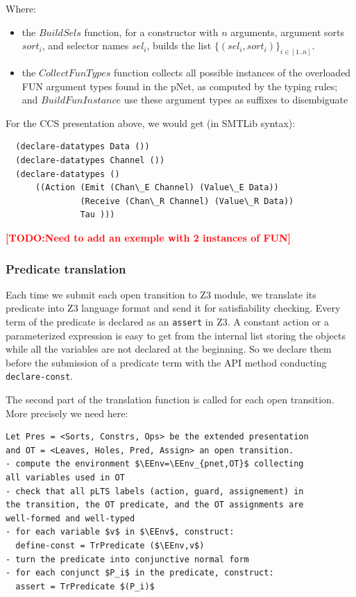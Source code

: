 \documentclass{lncs/llncs}
\newcommand{\TODO}[1]{\textcolor{red}{\textbf{[TODO:#1]}}}
\newcommand{\QIN}[1]{\textcolor{airforceblue}{#1}}
\begin{document}
\smallskip
Where:
\begin{itemize}
  \item the $BuildSels$ function, for a constructor with $n$ arguments,
argument sorts $sort_i$, and selector names $sel_i$, builds the list
$\{(sel_i, sort_i)\}_{i\in[1..n]}$.
\item the $CollectFunTypes$ function collects all possible instances
  of the overloaded FUN argument types found in the pNet, as computed by the typing
  rules; and $BuildFunInstance$ use these argument types as suffixes
  to disembiguate 
\end{itemize}


\begin{example}
  For the CCS presentation above, we would get (in SMTLib syntax):
\begin{lstlisting}
  (declare-datatypes Data ())
  (declare-datatypes Channel ())
  (declare-datatypes ()
      ((Action (Emit (Chan\_E Channel) (Value\_E Data))
               (Receive (Chan\_R Channel) (Value\_R Data))
               Tau )))
  \end{lstlisting}
\end{example}

\TODO{Need to add an exemple with 2 instances of FUN}

 
\subsubsection{Predicate translation}

\QIN{Each time we submit each open transition to Z3 module, we translate
  its predicate into Z3 language format and send it for satisfiability
  checking. Every term of the predicate is declared as an
  \texttt{assert} in Z3. A constant action or a parameterized
  expression is easy to get from the internal list storing the objects
  while all the variables are not declared at the beginning. So we
  declare them before the submission of a predicate term with the API
  method conducting \texttt{declare-const}.}

The second part of the translation function is called for each open
transition. More precisely we need here:

\begin{lstlisting}
Let Pres = <Sorts, Constrs, Ops> be the extended presentation
and OT = <Leaves, Holes, Pred, Assign> an open transition.
- compute the environment $\EEnv=\EEnv_{pnet,OT}$ collecting
all variables used in OT
- check that all pLTS labels (action, guard, assignement) in
the transition, the OT predicate, and the OT assignments are
well-formed and well-typed
- for each variable $v$ in $\EEnv$, construct:
  define-const = TrPredicate ($\EEnv,v$)
- turn the predicate into conjunctive normal form
- for each conjunct $P_i$ in the predicate, construct:
  assert = TrPredicate $(P_i)$
\end{lstlisting}
\end{document}
